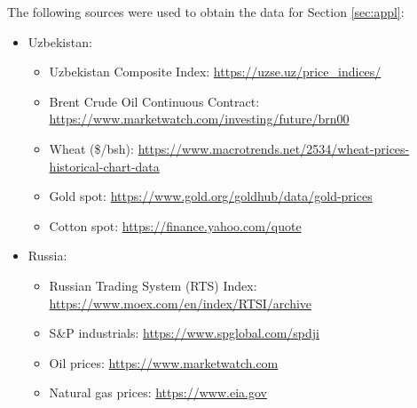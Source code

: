 The following sources were used to obtain the data for Section \ref{sec:appl}:
\begin{itemize}
\item[] Uzbekistan:
\begin{itemize}
    \item Uzbekistan Composite Index:    
    \url{https://uzse.uz/price_indices/}

    \item Brent Crude Oil Continuous Contract:    
    \url{https://www.marketwatch.com/investing/future/brn00}

    \item Wheat (\$/bsh):   
    \url{https://www.macrotrends.net/2534/wheat-prices-historical-chart-data}

    \item Gold spot: \url{https://www.gold.org/goldhub/data/gold-prices}
    \item Cotton spot:     
    \url{https://finance.yahoo.com/quote}
\end{itemize}
    \item[] Russia:
    \begin{itemize}
        \item Russian Trading System (RTS) Index:
    \url{https://www.moex.com/en/index/RTSI/archive}
\item S\&P industrials: \url{https://www.spglobal.com/spdji}
\item Oil prices: \url{https://www.marketwatch.com}
\item Natural gas prices: 
\url{https://www.eia.gov}
    \end{itemize}

\end{itemize}





















